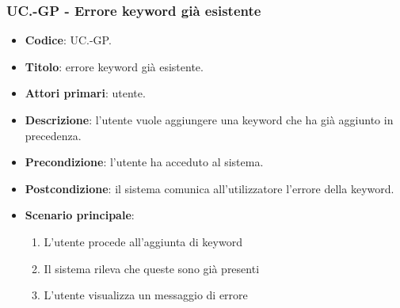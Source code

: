 	\subsubsection{UC\theuccount.\thesubuccount-GP - Errore keyword già esistente}

	\begin{itemize}
		\item \textbf{Codice}: UC\theuccount.\thesubuccount-GP.
		\item \textbf{Titolo}: errore keyword già esistente.
		\item \textbf{Attori primari}: utente.
		\item \textbf{Descrizione}: l'utente vuole aggiungere una keyword che ha già aggiunto in precedenza.
		\item \textbf{Precondizione}:  l’utente ha acceduto al sistema.
		\item \textbf{Postcondizione}: il sistema comunica all’utilizzatore l’errore della keyword.
		\item \textbf{Scenario principale}:
		\begin{enumerate}
			\item L'utente procede all'aggiunta di keyword
			\item Il sistema rileva che queste sono già presenti
			\item L'utente visualizza un messaggio di errore
		\end{enumerate}
	\end{itemize}